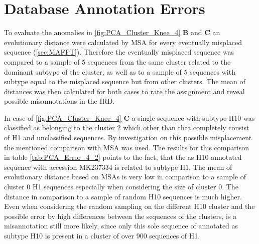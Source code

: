 \section{Database Annotation Errors} \label{sec:Clustering_Anomalies}

To evaluate the anomalies in \autoref{fig:PCA_Cluster_Knee_4} \textbf{\textsf{B}} and \textbf{\textsf{C}}  an evolutionary distance were calculated by \gls{MSA} for every eventually misplaced sequence (\autoref{sec:MAFFT}). Therefore the eventually misplaced sequence was compared to a sample of 5 sequences from the same cluster related to the dominant subtype of the cluster, as well as to a sample of 5 sequences with subtype equal to the misplaced sequence but from other clusters. The mean of distances was then calculated for both cases to rate the assignment and reveal possible misannotations in the \gls{IRD}. 

\begin{table}[!hbt]
    \centering
    \caption[Anomalies in Segment 4 Cluster 2 (\Acrshort{PCA})]{\textbf{Anomalies in Segment 4 Cluster 2 (\Acrshort{PCA}).}.}
    \label{tab:PCA_Error_4_2}
\end{table}

In case of \autoref{fig:PCA_Cluster_Knee_4} \textbf{\textsf{C}} a single sequence with subtype H10 was classified as belonging to the cluster 2 which other than that completely consist of H1 and unclassified sequences. By investigation on this possible misplacement the mentioned comparison with \gls{MSA} was used. The results for this comparison in table \autoref{tab:PCA_Error_4_2} points to the fact, that the as H10 annotated sequence with accession MK237334 is related to subtype H1. The mean of evolutionary distance based on \glspl{MSA} is very low in comparison to a sample of cluster 0 H1 sequences especially when considering the size of cluster 0. The distance in comparison to a sample of random H10 sequences is much higher. Even when considering the random sampling on the different H10 cluster and the possible error by high differences between the sequences of the clusters, is a misannotation still more likely, since only this sole sequence of annotated as subtype H10 is present in a cluster of over 900 sequences of H1. 

